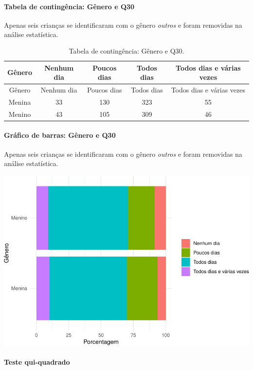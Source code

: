 \documentclass[]{article}
\let\oldparagraph\paragraph
\renewcommand{\paragraph}[1]{\oldparagraph{#1}\mbox{}}
\begin{document}
\cleardoublepage

\hypertarget{tabela-de-continguxeancia-guxeanero-e-q30}{%
\paragraph{Tabela de contingência: Gênero e Q30}\label{tabela-de-continguxeancia-guxeanero-e-q30}}

Apenas seis crianças se identificaram com o gênero \emph{outros} e foram removidas na análise estatística.

\begin{longtable}[]{@{}ccccc@{}}
\caption{\label{tab:unnamed-chunk-966}Tabela de contingência: Gênero e Q30.}\tabularnewline
\toprule
Gênero & Nenhum dia & Poucos dias & Todos dias & Todos dias e várias vezes\tabularnewline
\midrule
\endfirsthead
\toprule
Gênero & Nenhum dia & Poucos dias & Todos dias & Todos dias e várias vezes\tabularnewline
\midrule
\endhead
Menina & 33 & 130 & 323 & 55\tabularnewline
Menino & 43 & 105 & 309 & 46\tabularnewline
\bottomrule
\end{longtable}

\hypertarget{gruxe1fico-de-barras-guxeanero-e-q30}{%
\paragraph{Gráfico de barras: Gênero e Q30}\label{gruxe1fico-de-barras-guxeanero-e-q30}}

Apenas seis crianças se identificaram com o gênero \emph{outros} e foram removidas na análise estatística.

\begin{center}\includegraphics[width=0.75\linewidth]{relatorio_covid19_files/figure-latex/unnamed-chunk-967-1} \end{center}

\hypertarget{teste-qui-quadrado-83}{%
\paragraph{Teste qui-quadrado}\label{teste-qui-quadrado-83}}
\end{document}
